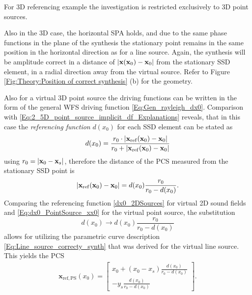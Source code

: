 For 3D referencing example the investigation is restricted exclusively to 3D point sources.

Also in the 3D case, the horizontal SPA holds, and due to the same phase functions in the plane of the synthesis the stationary point remains in the same position in the horizontal direction as for a line source.
Again, the synthesis will be amplitude correct in a distance of $| \mathbf{x}(\mathbf{x}_0) - \mathbf{x}_0 |$ from the stationary SSD element, in a radial direction away from the virtual source. 
Refer to Figure \ref{Fig:Theory:Position of correct synthesis} (b) for the geometry. 

Also for a virtual 3D point source the driving functions can be written in the form of the general WFS driving function \eqref{Eq:Gen_rayleigh_dx0}.
Comparison with \eqref{Eq:2_5D_point_source_implicit_df_Explanations} reveals, that in this case the \emph{referencing function} $d(x_0)$ for each SSD element can be stated as
\begin{equation}
d(x_0) = \frac{ r_0 \cdot | \mathbf{x}_{\mathrm{ref}}(\mathbf{x}_0) - \mathbf{x}_0|  }{ r_0 + | \mathbf{x}_{\mathrm{ref}}(\mathbf{x}_0) - \mathbf{x}_0| }
\label{Eq:dx0_PointSource}
\end{equation}
using $r_0 = | \mathbf{x}_0 - \mathbf{x}_s |$, therefore the distance of the PCS measured from the stationary SSD point is
%
\begin{equation}
|\mathbf{x}_{\mathrm{ref}}(\mathbf{x}_0) - \mathbf{x}_0| = d(x_0)\frac{r_0}{r_0 - d(x_0)}.
\label{Eq:dx0_PointSource_xx0}
\end{equation}
%
Comparing the referencing function \eqref{dx0_2DSources} for virtual 2D sound fields and \eqref{Eq:dx0_PointSource_xx0} for the virtual point source, the substitution
\begin{equation}
d(x_0) \rightarrow d(x_0)\frac{r_0}{r_0 - d(x_0)}
\label{Eq:dx0_mapping}
\end{equation}
allows for utilizing the parametric curve description \eqref{Eq:Line_source_correcty_synth} that was derived for the virtual line source. 
This yields the PCS
\begin{align}
\mathbf{x}_{\mathrm{ref,PS}}(x_0)=
\begin{bmatrix}
x_0 + (x_0-x_s) \frac{d(x_0)}{r_0 - d(x_0)}\\
-y_s \frac{d(x_0)}{r_0 - d(x_0)}
\end{bmatrix}.
\label{Eq:3D_curve}
\end{align}

